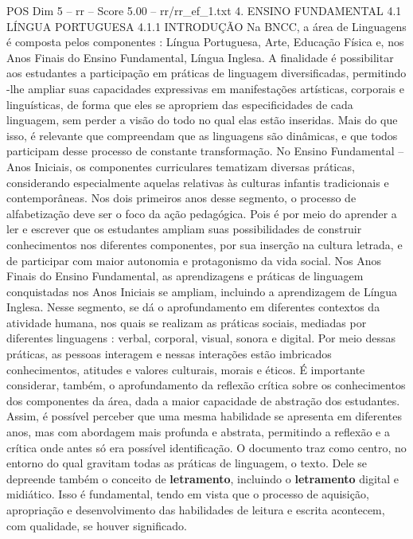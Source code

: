 \begin{textsample}{POS Dim 5 – rr – Score 5.00 – rr/rr\_ef\_1.txt}  \label{ex:f5_pos_226}
4.
ENSINO FUNDAMENTAL 4.1 LÍNGUA PORTUGUESA 4.1.1 INTRODUÇÃO Na BNCC, a área de Linguagens é composta pelos componentes : Língua Portuguesa, Arte, Educação Física e, nos Anos Finais do Ensino Fundamental, Língua Inglesa.
A finalidade é possibilitar aos estudantes a participação em práticas de linguagem diversificadas, permitindo -lhe ampliar suas capacidades expressivas em manifestações artísticas, corporais e linguísticas, de forma que eles se apropriem das especificidades de cada linguagem, sem perder a visão do todo no qual elas estão inseridas.
Mais do que isso, é relevante que compreendam que as linguagens são dinâmicas, e que todos participam desse processo de constante transformação.
No Ensino Fundamental – Anos Iniciais, os componentes curriculares tematizam diversas práticas, considerando especialmente aquelas relativas às culturas infantis tradicionais e contemporâneas.
Nos dois primeiros anos desse segmento, o processo de alfabetização deve ser o foco da ação pedagógica.
Pois é por meio do aprender a ler e escrever que os estudantes ampliam suas possibilidades de construir conhecimentos nos diferentes componentes, por sua inserção na cultura letrada, e de participar com maior autonomia e protagonismo da vida social.
Nos Anos Finais do Ensino Fundamental, as aprendizagens e práticas de linguagem conquistadas nos Anos Iniciais se ampliam, incluindo a aprendizagem de Língua Inglesa.
Nesse segmento, se dá o aprofundamento em diferentes contextos da atividade humana, nos quais se realizam as práticas sociais, mediadas por diferentes linguagens : verbal, corporal, visual, sonora e digital.
Por meio dessas práticas, as pessoas interagem e nessas interações estão imbricados conhecimentos, atitudes e valores culturais, morais e éticos.
É importante considerar, também, o aprofundamento da reflexão crítica sobre os conhecimentos dos componentes da área, dada a maior capacidade de abstração dos estudantes.
Assim, é possível perceber que uma mesma habilidade se apresenta em diferentes anos, mas com abordagem mais profunda e abstrata, permitindo a reflexão e a crítica onde antes só era possível identificação.
O documento traz como centro, no entorno do qual gravitam todas as práticas de linguagem, o texto.
Dele se depreende também o conceito de \textbf{letramento}, incluindo o \textbf{letramento} digital e midiático.
Isso é fundamental, tendo em vista que o processo de aquisição, apropriação e desenvolvimento das habilidades de leitura e escrita acontecem, com qualidade, se houver significado.

\end{textsample}
